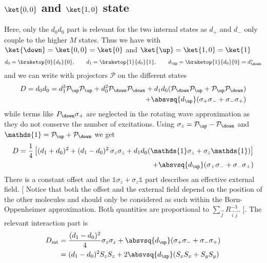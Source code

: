 \subsection{$\ket{0,0}$ and $\ket{1,0}$ state}
\newcommand{\pP}{\mathcal{P}}
Here, only the $d_0 d_0$ part is relevant for the two internal states as $d_+$ and $d_-$ only couple to the higher $M$ states. Thus we have with $\ket{\down}=\ket{0,0}=\ket{0}$ and $\ket{\up}=\ket{1,0}=\ket{1}$
\begin{align*}
d_{0} = \braketop{0}{d_0}{0},\qquad d_{1}=\braketop{1}{d_0}{1},\qquad d_{\up}=\braketop{1}{d_0}{0}=d_{\down}^*
\end{align*}
and we can write with projectors $\pP$ on the different states
\begin{align*}
D=d_0 d_0 = d_{1}^2 \pP_\up \pP_\up + d_{0}^2 \pP_\down \pP_\down + d_{1}d_{0} (\pP_\down \pP_\up + \pP_\up \pP_\down) \\
+ \absvsq{d_{\up}} (\sigma_+ \sigma_- + \sigma_- \sigma_+)
\end{align*}
while terms like $P_\down \sigma_+$ are neglected in the rotating wave approximation as they do not conserve the number of excitations. Using $\sigma_z = \pP_\up - \pP_\down$ and $\mathds{1}=\pP_\up + \pP_\down$ we get
\begin{align*}
D=\frac{1}{4} \left[ (d_1+d_0)^2 + (d_1-d_0)^2 \,\sigma_z \sigma_z + d_1 d_0 (\mathds{1}\sigma_z + \sigma_z \mathds{1}) \right]\\ + \absvsq{d_{\up}} (\sigma_+ \sigma_- + \sigma_- \sigma_+)
\end{align*}
There is a constant offset and the $\mathds{1}\sigma_z + \sigma_z\mathds{1}$ part describes an effective external field. [ Notice that both the offset and the external field depend on the position of the other molecules and should only be considered as such within the Born-Oppenheimer approximation. Both quantities are proportional to $\sum_{\vec{j}} R_{\vec{i}\vec{j}}^{-3}$. ]. The relevant interaction part is
\begin{align*}
D_\text{int}&=\frac{(d_1-d_0)^2}{4} \sigma_z \sigma_z + \absvsq{d_{\up}} (\sigma_+ \sigma_- + \sigma_- \sigma_+)\\
&= (d_1-d_0)^2 S_z S_z + 2\absvsq{d_{\up}} (S_x S_x + S_y S_y)
\end{align*}

